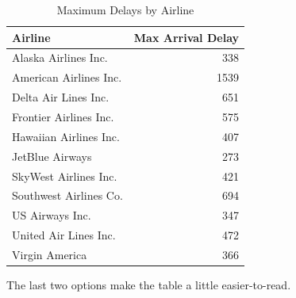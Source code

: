 \documentclass[12pt,twoside]{reedthesis}
\begin{document}
\begin{longtable}[t]{lr}
\caption[Max Delays by Airline]{\label{tab:maxdelays}Maximum Delays by Airline}\\
\toprule
Airline & Max Arrival Delay\\
\midrule
Alaska Airlines Inc. & 338\\
American Airlines Inc. & 1539\\
Delta Air Lines Inc. & 651\\
Frontier Airlines Inc. & 575\\
Hawaiian Airlines Inc. & 407\\
\addlinespace
JetBlue Airways & 273\\
SkyWest Airlines Inc. & 421\\
Southwest Airlines Co. & 694\\
US Airways Inc. & 347\\
United Air Lines Inc. & 472\\
\addlinespace
Virgin America & 366\\
\bottomrule
\end{longtable}
The last two options make the table a little easier-to-read.
\end{document}
